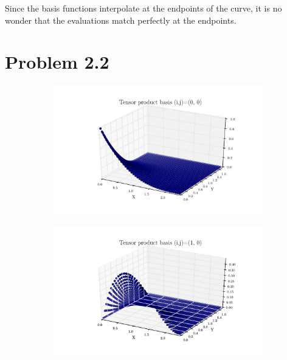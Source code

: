 \documentclass[11pt,letterpaper]{article}
\begin{document}
Since the basis functions interpolate at the endpoints of the curve, it is no wonder that the evaluations match perfectly at the endpoints.


\section{Problem 2.2}

\begin{figure}[!tbh]
  \begin{subfigure}[b]{.6\textwidth}
    \includegraphics[width=\textwidth]{problem_2_2_0_0.pdf}
    \caption{}
    \label{fig2:label:a}
  \end{subfigure}
  \hfill
  \begin{subfigure}[b]{.6\textwidth}
    \includegraphics[width=\textwidth]{problem_2_2_1_0.pdf}
    \caption{}
    \label{fig2:label:b}
  \end{subfigure}
  \hfill
    \begin{subfigure}[b]{.6\textwidth}

\end{subfigure}
\end{figure}
\end{document}
